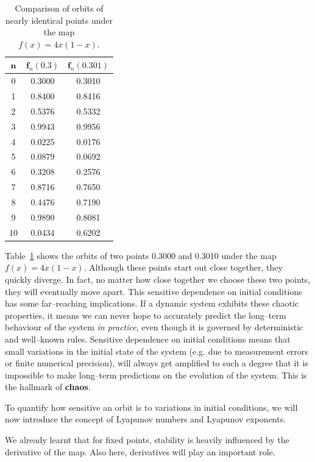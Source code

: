 \begin{table}[H]
\centering
\begin{tabular}{|c|c|c|}
\hline
${\mathbf n}$  & ${\mathbf f_n(0.3)}$ & ${\mathbf f_n(0.301)}$  \\
\hline
0  & 0.3000 & 0.3010  \\
\hline
1  & 0.8400 & 0.8416 \\
\hline
2  & 0.5376 & 0.5332 \\
\hline
3  & 0.9943 & 0.9956 \\
\hline
4  & 0.0225 & 0.0176 \\
\hline
5  & 0.0879 & 0.0692 \\
\hline
6  & 0.3208 & 0.2576 \\
\hline
7  & 0.8716 & 0.7650 \\
\hline
8  & 0.4476 & 0.7190 \\
\hline
9 & 0.9890 & 0.8081 \\
\hline
10 & 0.0434 & 0.6202 \\
\hline
\end{tabular}
\caption{Comparison of orbits of nearly identical points under the map $f(x)=4x(1-x)$.}
\label{table-sens}
\end{table}

Table~\ref{table-sens} shows the orbits of two points 0.3000 and 0.3010 under the map $f(x)=4x(1-x)$. Although these points start out close together, they quickly diverge. In fact, no matter how close together we choose these two points, they will eventually move apart. This sensitive dependence on initial conditions has some far--reaching implications. If a dynamic system exhibits these chaotic properties, it means we can never hope to accurately predict the long--term behaviour of the system \emph{in practice}, even though it is governed by deterministic and well--known rules. Sensitive dependence on initial conditions means that small variations in the initial state of the system (e.g. due to measurement errors or finite numerical precision), will always get amplified to such a degree that it is impossible to make long--term predictions on the evolution of the system. This is the hallmark of \textbf{chaos}.

To quantify how sensitive an orbit is to variations in initial conditions, we will now introduce the concept of Lyapunov numbers and Lyapunov exponents.

We already learnt that for fixed points, stability is heavily influenced by the derivative of the map. Also here, derivatives will play an important role.


